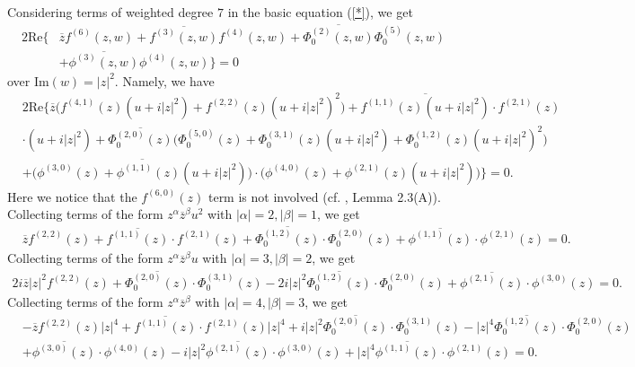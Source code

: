 \documentclass[12pt]{article}
\numberwithin{equation}{section}
\def\a{\alpha}
\def\ov{\overline}
\def\b{\beta}
\def\a{\alpha}
\def\a{\alpha}
\def\b{\beta}
\def\a{\alpha}
\def\a{\alpha}
\begin{document}
Considering terms of weighted degree $7$ in the basic equation
(\ref{*}), we get
\begin{equation}\begin{split}
2\text{Re}\Big\{&\ov{z}f^{(6)}(z,w)+\ov{f^{(3)}(z,w)}
f^{(4)}(z,w)+\ov{\Phi_0^{(2)}(z,w)}{\Phi_0^{(5)}(z,w)}\\
&+\ov{\phi^{(3)}(z,w)}{\phi^{(4)}}(z,w)\Big\}=0
\end{split}\end{equation}
over Im$(w)=|z|^2$. Namely, we have
\begin{equation}\begin{split}
&2\text{Re}\Big\{\ov{z}\Big(f^{(4,1)}(z)(u+i|z|^2)+f^{(2,2)}(z)(u+i|z|^2)^2\Big)+
\ov{f^{(1,1)}(z)(u+i|z|^2)}\cdot
f^{(2,1)}(z)\\
&\cdot(u+i|z|^2)+\ov{\Phi_0^{(2,0)}(z)}\Big(\Phi_0^{(5,0)}(z)
   +\Phi_0^{(3,1)}(z)(u+i|z|^2)+\Phi_0^{(1,2)}(z)(u+i|z|^2)^2\Big)\\
&+\ov{\big(\phi^{(3,0)}(z)+\phi^{(1,1)}(z)(u+i|z|^2)\big)}\cdot
\big(\phi^{(4,0)}(z)
   +\phi^{(2,1)}(z)(u+i|z|^2)\big)   \Big\}=0.
\end{split}\end{equation}
{Here we notice that the $f^{(6,0)}(z)$ term is not involved (cf.
\cite{HJX1}, Lemma 2.3(A)).} Collecting terms of the form
$z^{\a}\ov{z}^{\b}u^2$ with $|\a|=2,|\b|=1$, we get
\begin{equation}\begin{split}\label{212}
&\ov{z}f^{(2,2)}(z)+\ov{f^{(1,1)}(z)}\cdot f^{(2,1)}(z)
+\ov{\Phi_0^{(1,2)}(z)}\cdot
\Phi_0^{(2,0)}(z)+\ov{\phi^{(1,1)}(z)}\cdot \phi^{(2,1)}(z)=0.
\end{split}\end{equation}
Collecting terms of  the form $z^{\a}\ov{z}^{\b}u$ with
$|\a|=3,|\b|=2$, we get
\begin{equation}\begin{split}\label{321}
2i\ov{z}|z|^2f^{(2,2)}(z)+\ov{\Phi_0^{(2,0)}(z)}\cdot
\Phi_0^{(3,1)}(z)-2i|z|^2\ov{\Phi_0^{(1,2)}(z)}\cdot
\Phi_0^{(2,0)}(z)+\ov{\phi^{(2,1)}(z)}\cdot \phi^{(3,0)}(z)=0.
\end{split}\end{equation}
Collecting terms of  the form $z^{\a}\ov{z}^{\b}$ with
$|\a|=4,|\b|=3$, we get
\begin{equation}\begin{split}\label{430}
&-\ov{z}f^{(2,2)}(z)|z|^4+\ov{f^{(1,1)}(z)}\cdot
f^{(2,1)}(z)|z|^4+i|z|^2\ov{\Phi_0^{(2,0)}(z)}\cdot\Phi_0^{(3,1)}(z)-|z|^4\ov{\Phi_0^{(1,2)}(z)}\cdot
\Phi_0^{(2,0)}(z)\\
&+\ov{\phi^{(3,0)}(z)}\cdot
\phi^{(4,0)}(z)-i|z|^2\ov{\phi^{(2,1)}(z)}\cdot
\phi^{(3,0)}(z)+|z|^4\ov{\phi^{(1,1)}(z)}\cdot \phi^{(2,1)}(z)=0.
\end{split}\end{equation}
\end{document}
